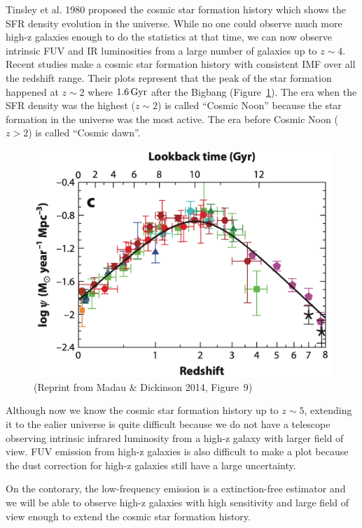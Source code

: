 Tinsley et al. 1980 proposed the cosmic star formation history which shows the SFR density evolution in the universe.
While no one could observe much more high-z galaxies enough to do the statistics at that time, we can now observe intrinsic FUV and IR luminosities from a large number of galaxies up to $z \sim 4$. 
Recent studies \citep{Hopkinse2010, Madau2014} make a cosmic star formation history with consistent IMF over all the redshift range.
Their plots represent that the peak of the star formation happened at $z\sim2$ where $1.6\,\mathrm{Gyr}$ after the Bigbang (Figure~\ref{fig:Madau2014_figure9}).
The era when the SFR density was the highest ($z \sim 2$) is called ``Cosmic Noon'' because the star formation in the universe was the most active.
The era before Cosmic Noon ($z > 2$) is called  ``Cosmic dawn''.

\begin{figure}[htbp]
	\centering
	\includegraphics[width=.6\linewidth]{Chapter_1/Figures/Madau2014_Figure9.png}
    \caption[Reprint from Madau \& Dickinson 2014 (Figure~9)]{\label{fig:Madau2014_figure9}
        (Reprint from Madau \& Dickinson 2014, Figure~9)\\
    }
\end{figure}

Although now we know the cosmic star formation history up to $z\sim5$, extending it to the ealier universe is quite difficult because we do not have a telescope observing intrinsic infrared luminosity from a high-z galaxy with larger field of view.
FUV emission from high-z galaxies is also difficult to make a plot because the dust correction for high-z galaxies still have a large uncertainty.

On the contorary, the low-frequency emission is a extinction-free estimator and we will be able to observe high-z galaxies with high sensitivity and large field of view enough to extend the cosmic star formation history.

